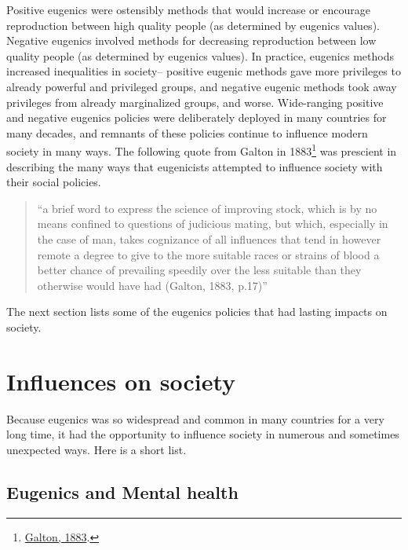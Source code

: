 \documentclass[
  oneside,
  12pt]{crumpbook}
\begin{document}
Positive eugenics were ostensibly methods that would increase or encourage reproduction between high quality people (as determined by eugenics values). Negative eugenics involved methods for decreasing reproduction between low quality people (as determined by eugenics values). In practice, eugenics methods increased inequalities in society-- positive eugenic methods gave more privileges to already powerful and privileged groups, and negative eugenic methods took away privileges from already marginalized groups, and worse. Wide-ranging positive and negative eugenics policies were deliberately deployed in many countries for many decades, and remnants of these policies continue to influence modern society in many ways. The following quote from Galton in 1883\footnote{\protect\hyperlink{ref-galtonInquiriesHumanFaculty1883}{Galton, 1883}.} was prescient in describing the many ways that eugenicists attempted to influence society with their social policies.

\begin{quote}
``a brief word to express the science of improving stock, which is by no means confined to questions of judicious mating, but which, especially in the case of man, takes cognizance of all influences that tend in however remote a degree to give to the more suitable races or strains of blood a better chance of prevailing speedily over the less suitable than they otherwise would have had (Galton, 1883, p.17)''
\end{quote}

The next section lists some of the eugenics policies that had lasting impacts on society.

\hypertarget{influences-on-society}{%
\section{Influences on society}\label{influences-on-society}}

Because eugenics was so widespread and common in many countries for a very long time, it had the opportunity to influence society in numerous and sometimes unexpected ways. Here is a short list.

\hypertarget{eugenics-and-mental-health}{%
\subsection{Eugenics and Mental health}\label{eugenics-and-mental-health}}
\end{document}
